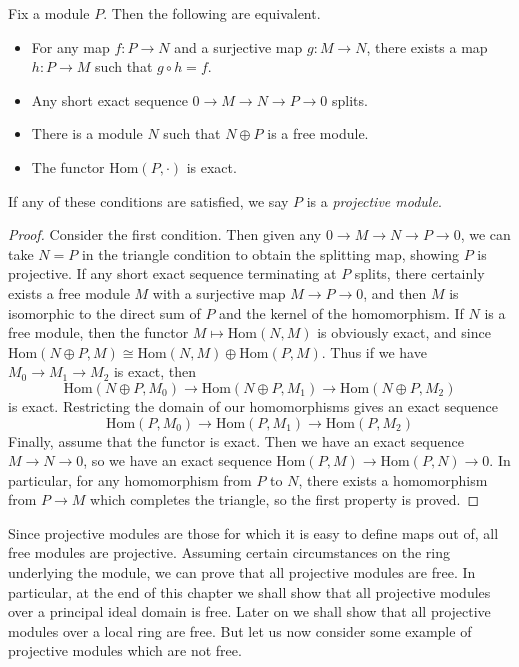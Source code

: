\begin{theorem}
    Fix a module $P$. Then the following are equivalent.
    \begin{itemize}
        \item For any map $f: P \to N$ and a surjective map $g: M \to N$, there exists a map $h: P \to M$ such that $g \circ h = f$.

        \item Any short exact sequence $0 \to M \to N \to P \to 0$ splits.

        \item There is a module $N$ such that $N \oplus P$ is a free module.

        \item The functor $\text{Hom}(P,\cdot)$ is exact.
    \end{itemize}
    If any of these conditions are satisfied, we say $P$ is a \emph{projective module}.
\end{theorem}
\begin{proof}
    Consider the first condition. Then given any $0 \to M \to N \to P \to 0$, we can take $N = P$ in the triangle condition to obtain the splitting map, showing $P$ is projective. If any short exact sequence terminating at $P$ splits, there certainly exists a free module $M$ with a surjective map $M \to P \to 0$, and then $M$ is isomorphic to the direct sum of $P$ and the kernel of the homomorphism. If $N$ is a free module, then the functor $M \mapsto \text{Hom}(N,M)$ is obviously exact, and since $\text{Hom}(N \oplus P, M) \cong \text{Hom}(N,M) \oplus \text{Hom}(P,M)$. Thus if we have $M_0 \to M_1 \to M_2$ is exact, then
    \[ \text{Hom}(N \oplus P, M_0) \to \text{Hom}(N \oplus P, M_1) \to \text{Hom}(N \oplus P, M_2) \]
    is exact. Restricting the domain of our homomorphisms gives an exact sequence
    \[ \text{Hom}(P,M_0) \to \text{Hom}(P,M_1) \to \text{Hom}(P,M_2) \]
    Finally, assume that the functor is exact. Then we have an exact sequence $M \to N \to 0$, so we have an exact sequence $\text{Hom}(P,M) \to \text{Hom}(P,N) \to 0$. In particular, for any homomorphism from $P$ to $N$, there exists a homomorphism from $P \to M$ which completes the triangle, so the first property is proved.
\end{proof}

Since projective modules are those for which it is easy to define maps out of, all free modules are projective. Assuming certain circumstances on the ring underlying the module, we can prove that all projective modules are free. In particular, at the end of this chapter we shall show that all projective modules over a principal ideal domain is free. Later on we shall show that all projective modules over a local ring are free. But let us now consider some example of projective modules which are not free.

